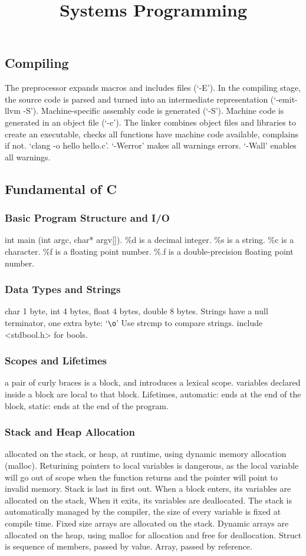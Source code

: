 \documentclass{article}
\title{Systems Programming}
\author{}
\date{}
\begin{document}
\small

\subsection*{Compiling}

The preprocessor expands macros and includes files (`-E').
In the compiling stage, the source code is parsed and turned into an intermediate representation (`-emit-llvm -S').
Machine-specific assembly code is generated (`-S').
Machine code is generated in an object file (`-c').
The linker combines object files and libraries to create an executable,
checks all functions have machine code available, complains if not.
`clang -o hello hello.c'.
`-Werror' makes all warnings errors.
`-Wall' enables all warnings.

\subsection*{Fundamental of C}

\subsubsection*{Basic Program Structure and I/O}
int main (int argc, char* argv[]). \%d is a decimal integer. \%s is a string. \%c is a character. \%f is a floating point number.
\%.f is a double-precision floating point number.

\subsubsection*{Data Types and Strings}
char 1 byte, int 4 bytes, float 4 bytes, double 8 bytes.
Strings have a null terminator, one extra byte: `\texttt{\textbackslash o}'
Use strcmp to compare strings.
include \textless stdbool.h\textgreater{} for bools.

\subsubsection*{Scopes and Lifetimes}
a pair of curly braces is a block, and introduces a lexical scope.
variables declared inside a block are local to that block.
Lifetimes, automatic: ends at the end of the block,
static: ends at the end of the program.

\subsubsection*{Stack and Heap Allocation}
allocated on the stack, or heap, at runtime, using dynamic memory allocation (malloc).
Returining pointers to local variables is dangerous, as the local variable will go out of
scope when the function returns and the pointer will point to invalid memory.
Stack is last in first out. When a block enters, its variables are allocated on the stack,
When it exits, its variables are deallocated.
The stack is automatically managed by the compiler, the size of every variable is fixed at compile time.
Fixed size arrays are allocated on the stack.
Dynamic arrays are allocated on the heap, using malloc for allocation and free for deallocation.
Struct is sequence of members, passed by value.
Array, passed by reference.
\end{document}
